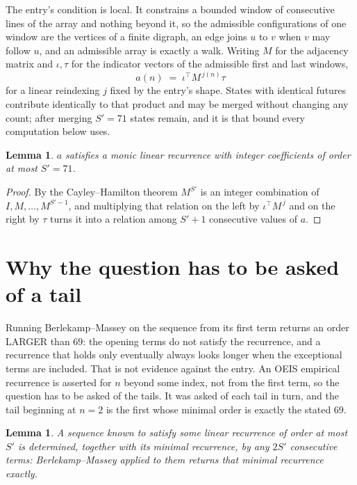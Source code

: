 \documentclass[11pt,a4paper]{article}
\theoremstyle{plain}
\newtheorem{lemma}[theorem]{Lemma}
\theoremstyle{definition}
\begin{document}
The entry's condition is local. It constrains a bounded window of consecutive lines of the
array and nothing beyond it, so the admissible configurations of one window are the vertices of
a finite digraph, an edge joins $u$ to $v$ when $v$ may follow $u$, and an admissible array is
exactly a walk. Writing $M$ for the adjacency matrix and $\iota,\tau$ for the indicator vectors
of the admissible first and last windows,
\[
a(n)\;=\;\iota^{\!\top}M^{\,j(n)}\tau
\]
for a linear reindexing $j$ fixed by the entry's shape. States with identical futures
contribute identically to that product and may be merged without changing any count; after
merging $S'=71$ states remain, and it is that bound every computation below uses.

\begin{lemma}\label{lem:cf}
$a$ satisfies a monic linear recurrence with integer coefficients of order at most $S'=71$.
\end{lemma}

\begin{proof}
By the Cayley--Hamilton theorem $M^{S'}$ is an integer combination of $I,M,\dots,M^{S'-1}$,
and multiplying that relation on the left by $\iota^{\!\top}M^{\,j}$ and on the right by
$\tau$ turns it into a relation among $S'+1$ consecutive values of $a$.
\end{proof}

\section{Why the question has to be asked of a tail}

Running Berlekamp--Massey on the sequence from its first term returns an order LARGER than $69$: the opening terms do not satisfy the recurrence, and a recurrence that holds only eventually always looks longer when the exceptional terms are included. That is not evidence against the entry. An OEIS empirical recurrence is asserted for $n$ beyond some index, not from the first term, so the question has to be asked of the tails. It was asked of each tail in turn, and the tail beginning at $n=2$ is the first whose minimal order is exactly the stated $69$.

\begin{lemma}\label{lem:bm}
A sequence known to satisfy some linear recurrence of order at most $S'$ is determined,
together with its minimal recurrence, by any $2S'$ consecutive terms: Berlekamp--Massey applied
to them returns that minimal recurrence exactly.
\end{lemma}
\end{document}
